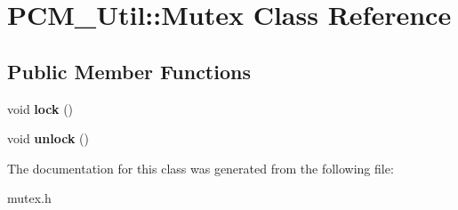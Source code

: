 \section{P\+C\+M\+\_\+\+Util\+:\+:Mutex Class Reference}
\label{classPCM__Util_1_1Mutex}
\subsection*{Public Member Functions}
\begin{DoxyCompactItemize}
\item 
void {\bfseries lock} ()\label{classPCM__Util_1_1Mutex_a04424b15dade04beb61030d077e20bc5}

\item 
void {\bfseries unlock} ()\label{classPCM__Util_1_1Mutex_a0ed943ad319ecdbac0a8bb0072c0fdfb}

\end{DoxyCompactItemize}


The documentation for this class was generated from the following file\+:\begin{DoxyCompactItemize}
\item 
mutex.\+h\end{DoxyCompactItemize}
